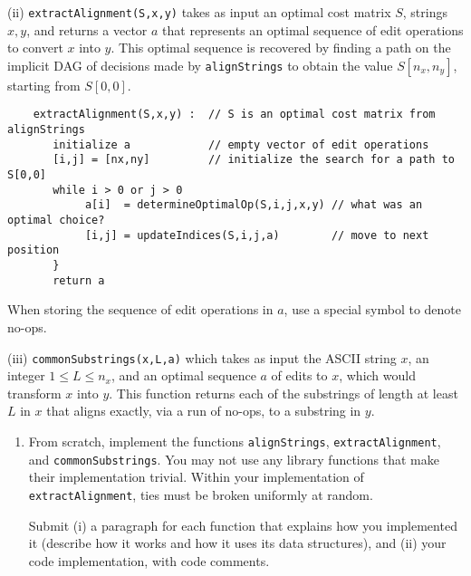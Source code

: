 \documentclass[12pt]{article}
\begin{document}
\begin{enumerate}
	(ii) {\tt extractAlignment(S,x,y)} takes as input an optimal cost matrix $S$, strings $x,y$, and returns a vector $a$ that represents an optimal sequence of edit operations to convert $x$ into $y$. This optimal sequence is recovered by finding a path on the implicit DAG of decisions made by {\tt alignStrings} to obtain the value $S[n_{x},n_{y}]$, starting from $S[0,0]$. 
	\begin{small}
	\begin{verbatim}
	extractAlignment(S,x,y) :  // S is an optimal cost matrix from alignStrings
	   initialize a            // empty vector of edit operations
	   [i,j] = [nx,ny]         // initialize the search for a path to S[0,0]
	   while i > 0 or j > 0
	        a[i]  = determineOptimalOp(S,i,j,x,y) // what was an optimal choice?
	        [i,j] = updateIndices(S,i,j,a)        // move to next position
	   }
	   return a
	\end{verbatim}
	\end{small}
	When storing the sequence of edit operations in $a$, use a special symbol to denote no-ops.
	
	(iii) {\tt commonSubstrings(x,L,a)} which takes as input the ASCII string $x$, an integer $1\leq L \leq n_{x}$, and an optimal sequence $a$ of edits to $x$, which would transform $x$ into $y$. This function returns each of the substrings of length at least $L$ in $x$ that aligns exactly, via a run of no-ops, to a substring in $y$.
	\begin{enumerate}

	\item From scratch, implement the functions {\tt alignStrings}, {\tt extractAlignment}, and {\tt commonSubstrings}. You may not use any library functions that make their implementation trivial. Within your implementation of {\tt extractAlignment}, ties must be broken uniformly at random.
	
	Submit (i) a paragraph for each function that explains how you implemented it (describe how it works and how it uses its data structures), and (ii) your code implementation, with code comments. \label{q:align:code}
	

\end{enumerate}
\end{enumerate}
\end{document}
